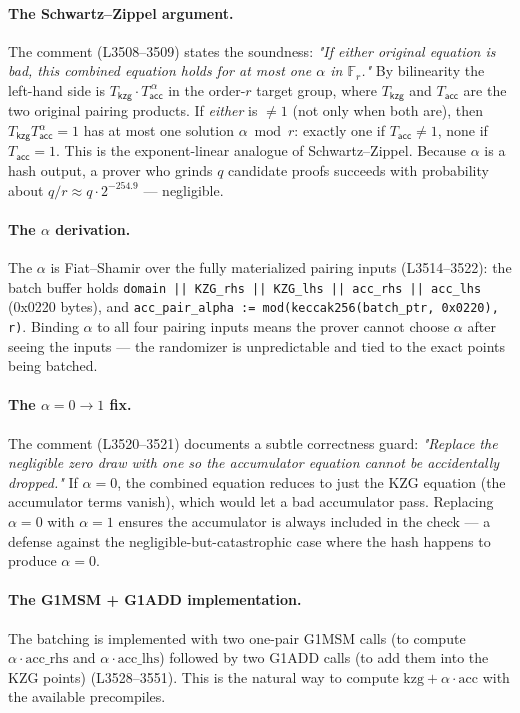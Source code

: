 \paragraph{The Schwartz--Zippel argument.} The comment
(L3508--3509) states the soundness: \emph{"If either original
equation is bad, this combined equation holds for at most one
$\alpha$ in $\mathbb{F}_r$."} By bilinearity the left-hand side is
$T_{\mathsf{kzg}}\cdot T_{\mathsf{acc}}^{\,\alpha}$ in the order-$r$
target group, where $T_{\mathsf{kzg}}$ and $T_{\mathsf{acc}}$ are the
two original pairing products. If \emph{either} is $\ne 1$ (not
only when both are), then
$T_{\mathsf{kzg}} T_{\mathsf{acc}}^{\alpha} = 1$ has at most one
solution $\alpha \bmod r$: exactly one if
$T_{\mathsf{acc}} \ne 1$, none if $T_{\mathsf{acc}} = 1$. This is
the exponent-linear analogue of Schwartz--Zippel. Because $\alpha$
is a hash output, a prover who grinds $q$ candidate proofs succeeds
with probability about $q/r \approx q\cdot 2^{-254.9}$ ---
negligible.

\paragraph{The $\alpha$ derivation.} The $\alpha$ is
Fiat--Shamir over the fully materialized pairing inputs
(L3514--3522): the batch buffer holds
\texttt{domain || KZG\_\allowbreak{}rhs || KZG\_\allowbreak{}lhs || acc\_\allowbreak{}rhs || acc\_\allowbreak{}lhs}
(0x0220 bytes), and
\texttt{acc\_\allowbreak{}pair\_\allowbreak{}alpha := mod(keccak256(batch\_\allowbreak{}ptr, 0x0220),
r)}. Binding $\alpha$ to all four pairing inputs means the prover
cannot choose $\alpha$ after seeing the inputs --- the
randomizer is unpredictable and tied to the exact points being
batched.

\paragraph{The $\alpha = 0 \to 1$ fix.} The comment
(L3520--3521) documents a subtle correctness guard:
\emph{"Replace the negligible zero draw with one so the
accumulator equation cannot be accidentally dropped."} If
$\alpha = 0$, the combined equation reduces to just the KZG
equation (the accumulator terms vanish), which would let a bad
accumulator pass. Replacing $\alpha = 0$ with $\alpha = 1$
ensures the accumulator is always included in the check --- a
defense against the negligible-but-catastrophic case where the
hash happens to produce $\alpha = 0$.

\paragraph{The G1MSM + G1ADD implementation.} The batching is
implemented with two one-pair G1MSM calls (to compute
$\alpha\cdot\text{acc\_rhs}$ and $\alpha\cdot\text{acc\_lhs}$)
followed by two G1ADD calls (to add them into the KZG points)
(L3528--3551). This is the natural way to compute
$\text{kzg} + \alpha\cdot\text{acc}$ with the available
precompiles.

